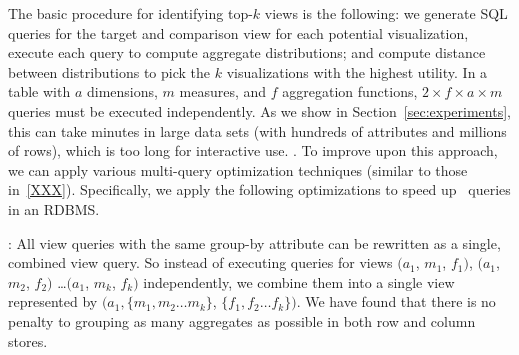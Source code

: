 The basic procedure for identifying top-$k$ views is the following: we generate 
SQL queries for the target and comparison view for each potential visualization, 
execute each query to compute aggregate distributions; and compute distance between
distributions to pick the $k$ visualizations with the highest utility. 
In a table with $a$ dimensions, $m$ measures, and $f$ aggregation functions, 
$2\times f \times a \times  m$ queries must be executed independently.  As we show in Section~\ref{sec:experiments}, this can take minutes in
large data sets (with hundreds of attributes and millions of rows), which is too long for interactive use. .
To improve upon this approach, we can apply various
multi-query optimization techniques (similar to those in~\ref{XXX}).
Specifically, we apply the following optimizations to speed up \SeeDB\ queries in an RDBMS.

: All view queries with the same group-by attribute can be 
rewritten as a single, 
combined view query. So instead of executing
queries for views $(a_1$, $m_1$, $f_1)$, $(a_1$, $m_2$, $f_2)$ \ldots $(a_1$, $m_k$, $f_k)$
independently, we combine them into a single view represented by
$(a_1, \{m_1, m_2\ldots m_k\}$, $\{f_1, f_2\ldots f_k\})$.  We have found that there is no penalty
to grouping as many aggregates as possible in both row and column stores. 

